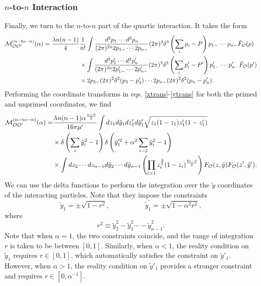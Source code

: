 \begin{subappendices}
\subsubsection{$n$-to-$n$ Interaction} Finally, we turn to the $n$-to-$n$ part of the quartic interaction. It takes the form \begin{equation}
	\begin{aligned}
		{\cal M}_{{\cal O} {\cal O}'}^{(n-\textrm{to}-n)}(\alpha) = \frac{\lambda n(n-1)}{4}& \frac{1}{n!} \int \frac{d^2p_1 \dotsb d^2 p_n}{(2\pi)^{2n} 2p_{1-} \dotsb 2p_{n-}} (2\pi)^3 \delta^3\left(\sum_i p_i - P \right) p_{1-} \dotsb p_{n-} \bar{F}_{{\cal O}}(p) \\
		&\times \int \frac{d^2 p'_1 \dotsb d^2 p'_n}{(2\pi)^{2n} 2p'_{1-} \dotsb 2p'_{n-}} (2\pi)^3 \delta^3\left(\sum_i p'_i - P' \right) p'_{1-} \dotsb p'_{n-} \bar{F}_{{\cal O}}(p') \\
		&\times 2p_{3-}(2\pi)^2 \delta^2(p_3 - p_3') \dotsb 2p_{n-} (2\pi)^2 \delta^2(p_n -p'_n).
	\end{aligned}
\end{equation} Performing the coordinate transforms in eqs. \eqref{xtrans}-\eqref{ytrans} for both the primed and unprimed coordinates, we find \begin{equation}
	\begin{aligned}
		{\cal M}_{{\cal O} {\cal O}'}^{(n-\textrm{to}-n)}(\alpha) =& \frac{\lambda n(n-1) \alpha^{\frac{n-3}{2}}}{16 \pi \mu'} \int dz_1  d\tilde{y}_1 dz'_1 d\tilde{y}'_1 \sqrt{z_1 (1-z_1) z'_1 (1-z'_1)} \\
		&\times \delta\left(\sum_i \tilde{y}_i^2 - 1 \right) \delta\left({\tilde{y}_1}^{\prime 2} +  \alpha^2 \sum_{i =2}\tilde{y}_i^2  -1\right) \\
		&\times \int dz_2 \dotsb dz_{n-1} d\tilde{y}_2 \dotsb d\tilde{y}_{n-1} \left( \prod_{i>1} z_i^{\frac{3}{2}} (1-z_i)^{\frac{5i-3}{2}} \right) F_{{\cal O}}(z,\tilde{y}) F_{{\cal O}}(z',\tilde{y}').
	\end{aligned}
\end{equation} We can use the delta functions to perform the integration over the $\tilde{y}$ coordinates of the interacting particles. Note that they impose the constraints \begin{equation}
	\tilde{y}_1 = \pm\sqrt{1-r^2}, \quad\quad\quad\quad\quad \tilde{y}_1^{\prime} = \pm \sqrt{ 1 - \alpha^2 r^2},
\end{equation} where \begin{equation}
	r^2 \equiv \tilde{y}_2^2 - \tilde{y}_3^2 \dotsb - \tilde{y}_{n-1}^2.
\end{equation} Note that when $\alpha =1$, the two constraints coincide, and the range of integration $r$ is taken to be between $[0,1]$. Similarly, when $\alpha < 1 $, the reality condition on $\tilde{y}_1$ requires $r \in [0,1]$, which automatically satisfies the constraint on $\tilde{y}'_1$. However, when $\alpha > 1$, the reality condition on $\tilde{y}'_1$ provides a stronger constraint and requires $r \in [0, \alpha^{-1} ]$.


\end{subappendices}
